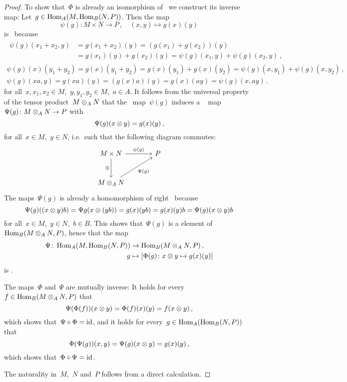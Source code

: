 \begin{proof}
  To show that~$\Phi$ is already an isomorphism of~{\modules{$\kf$}} we construct its inverse map:
  Let~$g \in \operatorname{Hom}_A(M, \operatorname{Hom}_B(N,P))$.
  Then the map
  \[
            \psi(g)
    \colon  M \times N
    \to     P \,,
    \quad   (x,y)
    \mapsto g(x)(y)
  \]
  is~{} because
  \begin{gather*}
    \begin{aligned}
          \psi(g)(x_1 + x_2, y)
      &=  g(x_1 + x_2)(y)
       =  (g(x_1) + g(x_2))(y)  \\
      &=  g(x_1)(y) + g(x_2)(y)
       =  \psi(g)(x_1,y) + \psi(g)(x_2,y) \,,
    \end{aligned}
  \\
      \psi(g)(x)(y_1 + y_2)
    = g(x)(y_1 + y_2)
    = g(x)(y_1) + g(x)(y_2)
    = \psi(g)(x, y_1) + \psi(g)(x, y_2) \,,
  \\
      \psi(g)(xa, y)
    = g(xa)(y)
    = (g(x)a)(y)
    = g(x)(ay)
    = \psi(g)(x,ay) \,.
  \end{gather*}
  for all~$x, x_1, x_2 \in M$,~$y, y_1, y_2 \in M$,~$a \in A$.
  It follows from the universal property of the tensor product~$M \otimes_A N$ that the~{} map~$\psi(g)$ induces a {\welldef}~{\klin} map~$\Psi(g) \colon M \otimes_A N \to P$ with
  \[
      \Psi(g)(x \otimes y)
    = g(x)(y) \,,
  \]
  for all~$x \in M$,~$y \in N$, i.e.\ such that the following diagram commutes:
  \[
    \begin{tikzcd}[sep = large]
        M \times N
        \arrow{r}[above]{\psi(g)}
        \arrow{d}[left]{\tensor}
      & P
      \\
        M \tensor_A N
        \arrow{ur}[below right]{\Psi(g)}
      & {}
    \end{tikzcd}
  \]
  The maps~$\Psi(g)$ is already a homomorphism of right~{} because
  \[
      \Psi(g)((x \otimes y) b)
    = \Psi{g}(x \otimes (yb))
    = g(x)(yb)
    = g(x)(y) b
    = \Psi(g)(x \otimes y) b
  \]
  for all~$x \in M$,~$y \in N$,~$b \in B$.
  This shows that~$\Psi(g)$ is a {\welldef} element of~$\operatorname{Hom}_B(M \otimes_A N, P)$, hence that the map
  \begin{align*}
              \Psi
     \colon   \operatorname{Hom}_A(M, \operatorname{Hom}_B(N,P))
    &\to      \operatorname{Hom}_B(M \otimes_A N, P) \,, \\
              g
    &\mapsto  \left[
                        \Phi(g)
                \colon  x \otimes y
                \mapsto g(x)(y)
              \right]
  \end{align*}
  is {\welldef}.
  
  The maps~$\Phi$ and~$\Psi$ are mutually inverse:
  It holds for every~$f \in \operatorname{Hom}_B(M \otimes_A N, P)$ that
  \[
      \Psi(\Phi(f))(x \otimes y)
    = \Phi(f)(x)(y)
    = f(x \otimes y) \,,
  \]
  which shows that~$\Psi \circ \Phi = \mathrm{id}$, and it holds for every~$g \in \operatorname{Hom}_A(\operatorname{Hom}_B(N, P))$ that
  \[
      \Phi(\Psi(g))(x,y)
    = \Psi(g)(x \otimes y)
    = g(x)(y) \,,
  \]
  which shows that~$\Phi \circ \Psi = \mathrm{id}$.
  
  The naturality in~$M$,~$N$ and~$P$ follows from a direct calculation.
\end{proof}




